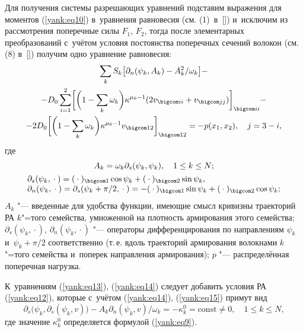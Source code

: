 Для получения системы разрешающих уравнений подставим выражения для моментов (\ref{yank:eq10}) в~уравнения равновесия (см. (1)~в~[]) и~исключим из рассмотрения поперечные силы $F_1 $, $F_2 $, тогда после элементарных преобразований
с~учётом условия постоянства поперечных сечений волокон (см. (8) в~[]) получим одно уравнение равновесия:
\begin{multline} \label{yank:eq13}
\sum\limits_k S_k \bigl[\partial_{n}(\psi_k ,A_k )-A_k ^2 /\omega_k \bigr]- \\ -
D_0 \sum\limits_{i=1}^2\biggl[\biggl(1-\sum\limits_k \omega_k \biggr)\kappa^{\mu_0 -1}
(2v_{\bigcom ii}+v_{\bigcom jj})\biggr]_{\bigcom ii}-\\
-2D_0 \biggl[\biggl(1-\sum\limits_k \omega_k \biggr)\kappa^{\mu_0 -1}v_{\bigcom 12}\biggr]_{\bigcom 12}=-p(x_1 , x_2 ), \quad j=3-i,
\end{multline}
где
\begin{gather} \label{yank:eq14}
A_k =\omega_k \partial_s (\psi_k ,\psi_k ), \quad 1\leq k \leq N;
\\
\label{yank:eq15}
\begin{array}{l}
\partial_s (\psi_k ,{} \cdot {})=({} \cdot {})_{\bigcom 1}\cos\psi_k +({} \cdot {})_{\bigcom 2}\sin\psi_k , \\
\partial_{n}(\psi_k ,{} \cdot {})=\partial_s (\psi_k +\pi/2,{} \cdot {})=-({} \cdot {})_{\bigcom 1}\sin\psi_k +({} \cdot {})_{\bigcom 2}\cos\psi_k ;
\end{array}
\end{gather}
$A_k $ "--- введенные для удобства функции, имеющие смысл кривизны траекторий РА $k$"=того семейства, умноженной на плотность
армирования этого семейства; $\partial_s (\psi_k ,{} \cdot {})$, $\partial_{n}(\psi_k ,{} \cdot {})$ "---
операторы дифференцирования по направлениям $\psi_k $ и~$\psi_k +\pi/2$ соответственно (т.\,е. вдоль траекторий армирования волокнами $k$"=того семейства и~поперек направления армирования); $p$ "--- распределённая поперечная нагрузка.

К~уравнениям (\ref{yank:eq13}), (\ref{yank:eq14}) следует добавить условия РА (\ref{yank:eq12}), которые с~учётом (\ref{yank:eq14}), (\ref{yank:eq15}) примут вид
\begin{equation} \label{yank:eq16}
\partial_s \bigl(\psi_k ,\partial_s (\psi_k ,v)\bigr)-A_k \partial_{n}(\psi_k ,v)/\omega_k =-\kappa_k ^0 =\text{const}\neq0, \quad 1\leq k \leq N,
\end{equation}
где значение $\kappa_k ^0 $ определяется формулой (\ref{yank:eq9}).

